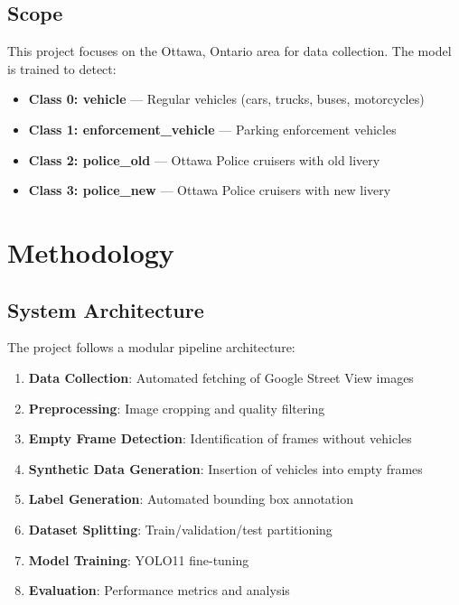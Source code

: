 \documentclass[12pt,a4paper]{article}
\begin{document}
\subsection{Scope}

This project focuses on the Ottawa, Ontario area for data collection. The model is trained to detect:
\begin{itemize}
	\item \textbf{Class 0: vehicle} --- Regular vehicles (cars, trucks, buses, motorcycles)
	\item \textbf{Class 1: enforcement\_vehicle} --- Parking enforcement vehicles
	\item \textbf{Class 2: police\_old} --- Ottawa Police cruisers with old livery
	\item \textbf{Class 3: police\_new} --- Ottawa Police cruisers with new livery
\end{itemize}

\section{Methodology}

\subsection{System Architecture}

The project follows a modular pipeline architecture:

\begin{enumerate}
	\item \textbf{Data Collection}: Automated fetching of Google Street View images
	\item \textbf{Preprocessing}: Image cropping and quality filtering
	\item \textbf{Empty Frame Detection}: Identification of frames without vehicles
	\item \textbf{Synthetic Data Generation}: Insertion of vehicles into empty frames
	\item \textbf{Label Generation}: Automated bounding box annotation
	\item \textbf{Dataset Splitting}: Train/validation/test partitioning
	\item \textbf{Model Training}: YOLO11 fine-tuning
	\item \textbf{Evaluation}: Performance metrics and analysis
\end{enumerate}
\end{document}

